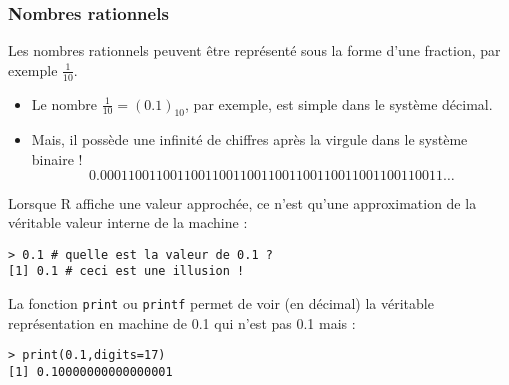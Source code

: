 \documentclass[10pt]{beamer}
\begin{document}

\begin{frame}[fragile]
  \frametitle{Nombres rationnels}
  Les nombres rationnels peuvent être représenté sous la forme d'une fraction, par exemple $\frac{1}{10}$.
  \begin{itemize}
  \item Le nombre $\frac{1}{10} = (0.1)_{10}$, par exemple, est simple dans le système décimal.
  \item Mais, il possède une infinité de chiffres après la virgule dans le système binaire !
    \[0.0001100110011001100110011001100110011001100110011\ldots\]
  \end{itemize}
  Lorsque R affiche une valeur approchée, ce n'est qu'une approximation de la véritable valeur interne de la machine :
  \begin{lstlisting}
> 0.1 # quelle est la valeur de 0.1 ?
[1] 0.1 # ceci est une illusion !    
\end{lstlisting}

La fonction \texttt{print} ou \texttt{printf} permet de voir (en décimal) la véritable représentation en machine de 0.1 qui n'est pas 0.1 mais :
\begin{lstlisting}
> print(0.1,digits=17)
[1] 0.10000000000000001
\end{lstlisting}
\end{frame}
\end{document}
